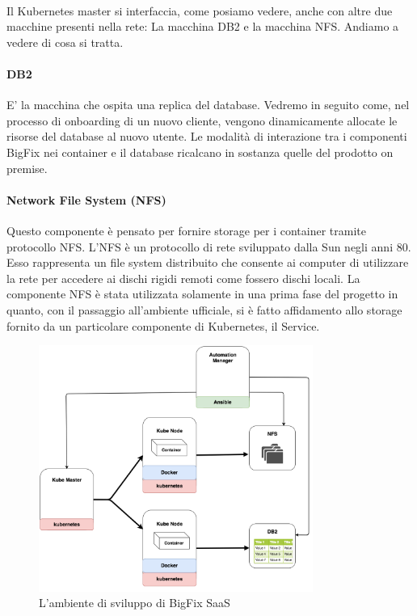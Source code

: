 \paragraph{}
Il Kubernetes master si interfaccia, come posiamo vedere, anche con altre due macchine presenti nella rete: La macchina DB2 e la macchina NFS. Andiamo a vedere di cosa si tratta.
\paragraph{DB2}
E' la macchina che ospita una replica del database. Vedremo in seguito come, nel processo di onboarding di un nuovo cliente, vengono dinamicamente allocate le risorse del database al nuovo utente. Le modalità di interazione tra i componenti BigFix nei container e il database ricalcano in sostanza quelle del prodotto on premise.
\paragraph{Network File System (NFS)}
Questo componente è pensato per fornire storage per i container tramite protocollo NFS. L'NFS è un protocollo di rete sviluppato dalla Sun negli anni 80. Esso rappresenta un file system distribuito che consente ai computer di utilizzare la rete per accedere ai dischi rigidi remoti come fossero dischi locali. La componente NFS è stata utilizzata solamente in una prima fase del progetto in quanto, con il passaggio all'ambiente ufficiale, si è fatto affidamento allo storage fornito da un particolare componente di Kubernetes, il Service. 

\begin{figure}[h!]
	\centering
	\includegraphics[width=0.8\textwidth,keepaspectratio=true]{capitoli/imgs/EnvironmentsComponentDiagram.png}
	\caption{L'ambiente di sviluppo di BigFix SaaS}
	\label{ambs}
\end{figure}


